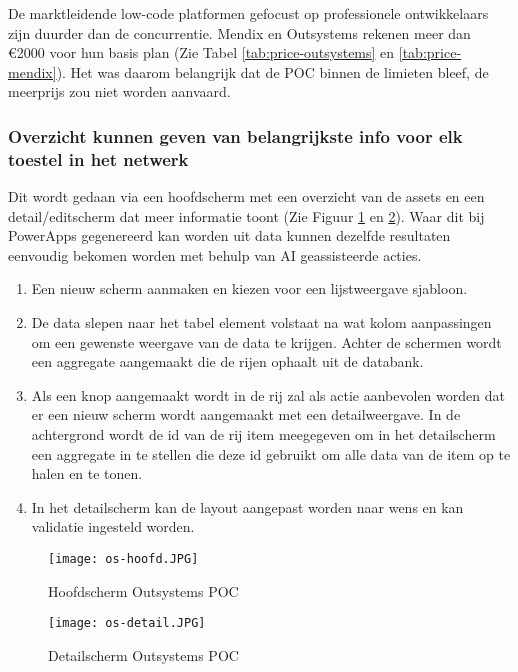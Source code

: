 De marktleidende low-code platformen gefocust op professionele ontwikkelaars zijn duurder dan de concurrentie. Mendix en Outsystems rekenen meer dan \euro2000 voor hun basis plan (Zie Tabel \ref{tab:price-outsystems} en \ref{tab:price-mendix}). Het was daarom belangrijk dat de POC binnen de limieten bleef, de meerprijs zou niet worden aanvaard.

\subsubsection{Overzicht kunnen geven van belangrijkste info voor elk toestel in het netwerk}

Dit wordt gedaan via een hoofdscherm met een overzicht van de assets en een detail/editscherm dat meer informatie toont (Zie Figuur \ref{fig:os-hoofd} en \ref{fig:os-detail}).
Waar dit bij PowerApps gegenereerd kan worden uit data kunnen dezelfde resultaten eenvoudig bekomen worden met behulp van AI geassisteerde acties.
\begin{enumerate}
    \item Een nieuw scherm aanmaken en kiezen voor een lijstweergave sjabloon.
    \item De data slepen naar het tabel element volstaat na wat kolom aanpassingen om een gewenste weergave van de data te krijgen. Achter de schermen wordt een aggregate aangemaakt die de rijen ophaalt uit de databank.
    \item Als een knop aangemaakt wordt in de rij zal als actie aanbevolen worden dat er een nieuw scherm wordt aangemaakt met een detailweergave. In de achtergrond wordt de id van de rij item meegegeven om in het detailscherm een aggregate in te stellen die deze id gebruikt om alle data van de item op te halen en te tonen.
    \item In het detailscherm kan de layout aangepast worden naar wens en kan validatie ingesteld worden.
\end{enumerate}

\begin{figure}[h!]
    \texttt{[image: os-hoofd.JPG]}
    \caption{Hoofdscherm Outsystems POC}
    \label{fig:os-hoofd}
\end{figure}

\begin{figure}[h!]
    \texttt{[image: os-detail.JPG]}
    \caption{Detailscherm Outsystems POC}
    \label{fig:os-detail}
\end{figure}

